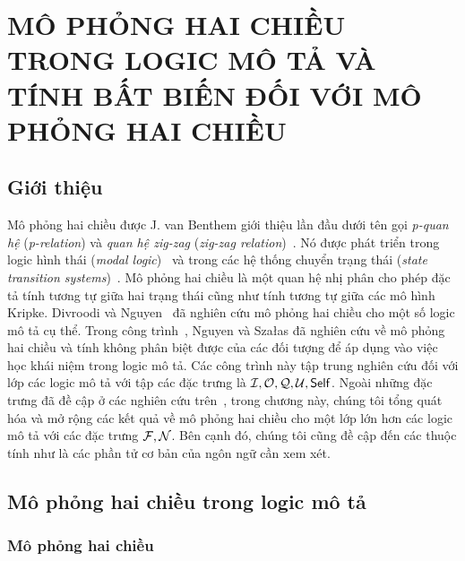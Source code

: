 \chapter[Mô phỏng hai chiều trong logic mô tả và tính bất biến đối~với mô phỏng hai chiều]{MÔ PHỎNG HAI CHIỀU TRONG LOGIC MÔ TẢ VÀ\!\\ TÍNH BẤT BIẾN ĐỐI VỚI MÔ PHỎNG HAI CHIỀU\!}
\label{Chapter2}
\thispagestyle{fancy}

\section{Giới thiệu}
\label{sec:Chap2.Introduction}
Mô phỏng hai chiều được J. van Benthem giới thiệu lần đầu dưới tên gọi {\em p-quan hệ} ({\em p-relation}) và {\em quan hệ zig-zag} ({\em zig-zag relation})~\cite{Benthem1983,Benthem1984}. Nó được phát triển trong logic hình thái ({\em modal logic})~\cite{Benthem2001,Blackburn2001,Blackburn2006,Benthem2010} và trong các hệ thống chuyển trạng thái ({\em state transition systems})~\cite{Park1981,Hennessy1985}. 
Mô phỏng hai chiều là một quan hệ nhị phân cho phép đặc tả tính tương tự giữa hai trạng thái cũng như tính tương tự giữa các mô hình Kripke. Divroodi và Nguyen~\cite{Divroodi2011B} đã nghiên cứu mô phỏng hai chiều cho một số logic mô tả cụ thể. Trong công trình~\cite{Nguyen2013}, Nguyen và Sza{\l}as đã nghiên cứu về mô phỏng hai chiều và tính không phân biệt được của các đối tượng để áp dụng vào việc học khái niệm trong logic mô tả. 
Các công trình này tập trung nghiên cứu đối với lớp các logic mô tả \ALCreg với tập các đặc trưng là $\mathcal{I}, \mathcal{O}, \mathcal{Q}, \mathcal{U}, \mathsf{Self}$. Ngoài những đặc trưng đã đề cập ở các nghiên cứu trên~\cite{Divroodi2011B,Nguyen2013}, trong chương này, chúng tôi tổng quát hóa và mở rộng các kết quả về mô phỏng hai chiều cho một lớp lớn hơn các logic mô tả với các đặc trưng $\mathcal{F}, \mathcal{N}$. Bên cạnh đó, chúng tôi cũng đề cập đến các thuộc tính như là các phần tử cơ bản của ngôn ngữ cần xem xét.

\section{Mô phỏng hai chiều trong logic mô tả}
\label{sec:Chap2.BisimulationInDL}
\subsection{Mô phỏng hai chiều}
\label{sec:Chap2.Bisimulation}

